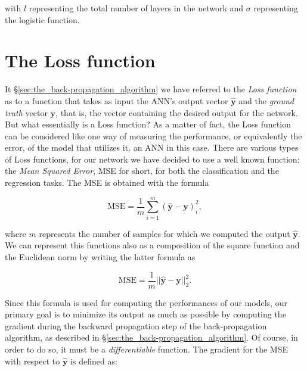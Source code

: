         with $l$ representing the total number of layers in the network and $\sigma$ representing the logistic
        function.


	\section{The Loss function} %
	\label{sec:the_loss_function}
		It \S \ref{sec:the_back-propagation_algorithm} we have referred to the \textit{Loss function} as to a
		function that takes as input the ANN's output vector $\hat{\mathbf{y}}$ and the \textit{ground truth}
		vector $\mathbf{y}$, that is, the vector containing the desired output for the network. But what
        essentially is a Loss function? As a matter of fact, the Loss function can be considered like
		one way of measuring the performance, or equivalently the error, of the model that utilizes it, an ANN in
		this case. There are various types of Loss functions, for our network we have decided to use a well
		known function: the \textit{Mean Squared Error}, MSE for short, for both the classification and the
        regression tasks. The MSE is obtained with the formula

		\begin{equation*}
		\label{mse}
		    \text{MSE} = \frac{1}{m}\sum_{i = 1}^{m}\left ( \hat{\mathbf{y}} - \mathbf{y} \right )^{2}_{i},
		\end{equation*}

		where $m$ represents the number of samples for which we computed the output $\hat{\mathbf{y}}$. We can
        represent this functions also as a composition of the square function and the Euclidean norm by writing
        the latter formula as

        \begin{equation*}
            \text{MSE} = \frac{1}{m}|| \hat{\mathbf{y}} - \mathbf{y} ||^2_2 .
        \end{equation*}

        Since this formula is used for computing the performances of our models, our primary goal is to minimize its
		output as much as possible by computing the gradient during the backward propagation step of the
		back-propagation algorithm, as described in \S \ref{sec:the_back-propagation_algorithm}. Of course,
        in order to do so, it must be a \textit{differentiable} function. The gradient for the MSE with respect to
		$\hat{\mathbf{y}}$ is defined as:


